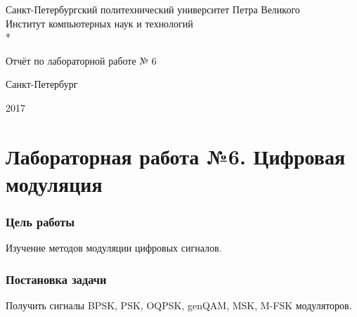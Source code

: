 \documentclass[a4paper,14pt]{article}
\begin{document}

\begin{titlepage}
	\newpage
	
	\begin{center}
		Санкт-Петербургский политехнический 
		университет Петра Великого \\
		\vspace{0.2cm}
		Институт компьютерных наук и технологий\\*
	\end{center}
	
	\vspace{10em}
	
	\begin{center}
		 Отчёт по лабораторной работе № 6
	\end{center}
	
	\vspace{2.5em}

	\vspace{6em}

	\vspace{\fill}
	
	\begin{center}
		Санкт-Петербург
		
		 2017
	\end{center}
	
\end{titlepage}

\tableofcontents

\newpage

\part*{Лабораторная работа №6. Цифровая модуляция}
\setcounter {section}{0}
\setcounter {equation}{0}
\setcounter {figure}{0}
\section{Цель работы}
\hspace{0,5cm}   Изучение методов модуляции цифровых сигналов.
\section{Постановка задачи}	
\hspace{0,5cm}Получить сигналы BPSK, PSK, OQPSK, genQAM, MSK, M-FSK модуляторов.\\
	
\end{document}
